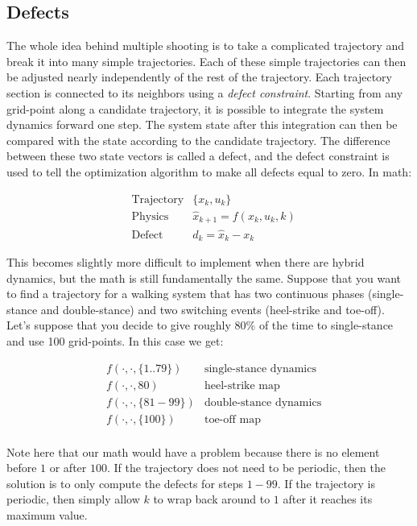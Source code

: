 \subsection {Defects}

The whole idea behind multiple shooting is to take a complicated trajectory and break it into many simple trajectories. Each of these simple trajectories can then be adjusted nearly independently of the rest of the trajectory. Each trajectory section is connected to its neighbors using a {\it defect constraint}. Starting from any grid-point along a candidate trajectory, it is possible to integrate the system dynamics forward one step. The system state after this integration can then be compared with the state according to the candidate trajectory. The difference between these two state vectors is called a defect, and the defect constraint is used to tell the optimization algorithm to make all defects equal to zero. In math:

\begin{align}
	&\text{Trajectory}  &\{x_k,u_k\} \\
	&\text{Physics}  &\hat{x}_{k+1} = f(x_k,u_k,k) \\
  	&\text{Defect}  &d_k = \hat{x}_k - x_k
\end{align}

\par This becomes slightly more difficult to implement when there are hybrid dynamics, but the math is still fundamentally the same. Suppose that you want to find a trajectory for a walking system that has two continuous phases (single-stance and double-stance) and two switching events (heel-strike and toe-off). Let's suppose that you decide to give roughly 80\% of the time to single-stance and use 100 grid-points. In this case we get: 

\begin{align}
	&f( \cdot, \cdot, \{1..79\})  & \text{single-stance dynamics} \\
	&f( \cdot, \cdot, 80)  & \text{heel-strike map} \\
	&f( \cdot, \cdot, \{81-99\})  & \text{double-stance dynamics} \\
	&f( \cdot, \cdot, \{100\})  & \text{toe-off map} \\
\end{align}

\par Note here that our math would have a problem because there is no element before $1$ or after $100$. If the trajectory does not need to be periodic, then the solution is to only compute the defects for steps $1-99$. If the trajectory is periodic, then simply allow $k$ to wrap back around to $1$ after it reaches its maximum value.
